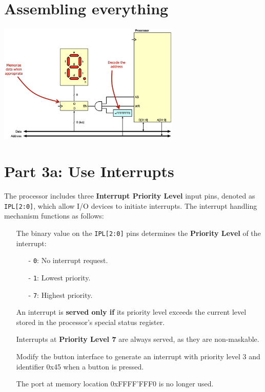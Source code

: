 \section{Assembling everything}
\begin{center}
    \includegraphics[width=0.65\textwidth]{chapters/chapter2e/images/circuit2.png}
\end{center}

\section{Part 3a: Use Interrupts}
The processor includes three \textbf{Interrupt Priority Level} input pins, denoted as \texttt{IPL[2:0]}, which allow I/O devices to initiate interrupts. The interrupt handling mechanism functions as follows:

\begin{itemize}
    \item[] The binary value on the \texttt{IPL[2:0]} pins determines the \textbf{Priority Level} of the interrupt:
    \begin{itemize}
        \item[-] \texttt{0}: No interrupt request.
        \item[-] \texttt{1}: Lowest priority.
        \item[-] \texttt{7}: Highest priority.
    \end{itemize}
    \item[] An interrupt is \textbf{served only if} its priority level exceeds the current level stored in the processor's special status register.
    \item[] Interrupts at \textbf{Priority Level 7} are always served, as they are non-maskable.
    \item[] Modify the button interface to generate an interrupt with priority level 3 and identifier 0x45 when a button is pressed.
    \item[] The port at memory location 0xFFFF'FFF0 is no longer used.
\end{itemize}

